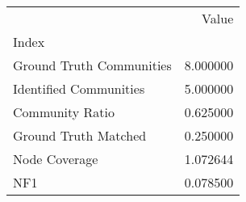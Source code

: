 \begin{tabular}{lr}
\toprule
{} &     Value \\
Index                    &           \\
\midrule
Ground Truth Communities &  8.000000 \\
Identified Communities   &  5.000000 \\
Community Ratio          &  0.625000 \\
Ground Truth Matched     &  0.250000 \\
Node Coverage            &  1.072644 \\
NF1                      &  0.078500 \\
\bottomrule
\end{tabular}
